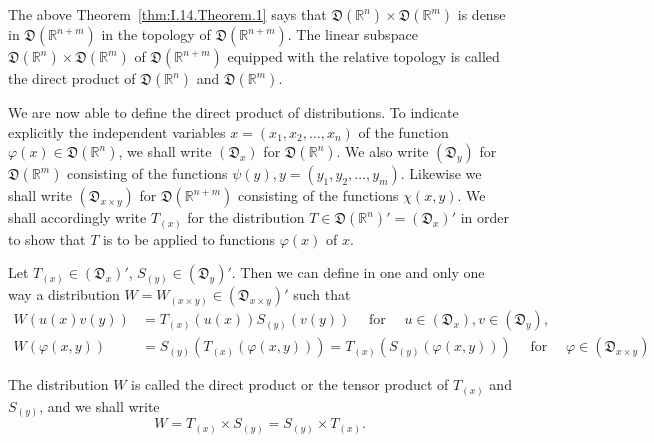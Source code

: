 The above Theorem~\ref{thm:I.14.Theorem.1} says that $\mathfrak{D}(\mathbb{R}^{n}) \times \mathfrak{D}(\mathbb{R}^{m})$ is dense in $\mathfrak{D}(\mathbb{R}^{n+m})$ in the topology of $\mathfrak{D}(\mathbb{R}^{n+m})$. The linear subspace $\mathfrak{D}(\mathbb{R}^{n}) \times \mathfrak{D}(\mathbb{R}^{m})$ of $\mathfrak{D}(\mathbb{R}^{n+m})$ equipped with the relative topology is called the direct product of $\mathfrak{D}(\mathbb{R}^{n})$ and $\mathfrak{D}(\mathbb{R}^{m})$. 

We are now able to define the direct product of distributions. To indicate explicitly the independent variables $x = (x_1, x_2, \ldots, x_n)$ of the function $\varphi(x) \in \mathfrak{D}(\mathbb{R}^{n})$, we shall write $(\mathfrak{D}_x)$ for $\mathfrak{D}(\mathbb{R}^{n})$. We also write $(\mathfrak{D}_y)$ for $\mathfrak{D}(\mathbb{R}^{m})$ consisting of the functions $\psi(y), y = (y_1, y_2, \ldots, y_m)$. Likewise we shall write $(\mathfrak{D}_{x \times y})$ for $\mathfrak{D}(\mathbb{R}^{n+m})$ consisting of the functions $\chi(x, y)$. We shall accordingly write $T_{(x)}$ for the distribution $T \in \mathfrak{D}(\mathbb{R}^{n})' = (\mathfrak{D}_x)'$ in order to show that $T$ is to be applied to functions $\varphi(x)$ of $x$. 

\begin{theorem}\label{thm:I.14.Theorem.2} Let $T_{(x)} \in (\mathfrak{D}_x)'$, $S_{(y)} \in (\mathfrak{D}_y)'$. Then we can define in one and only one way a distribution $W = W_{(x \times y)} \in (\mathfrak{D}_{x \times y})'$ such that 
\begin{align}
W (u (x) v (y))& = T_{(x)} (u (x)) S_{(y)} (v (y)) \quad \text{ for } \quad u \in (\mathfrak {D}_{x}), v \in (\mathfrak {D}_{y}), \label{eq:I.14.4} \\
W (\varphi (x, y))& = S_{(y)} \left(T_{(x)} (\varphi (x, y))\right) = T_{(x)} \left(S_{(y)} (\varphi (x, y))\right) \quad \text{ for } \quad \varphi \in (\mathfrak {D}_{x \times y}) \label{eq:I.14.5}
\end{align}
\end{theorem}

\begin{remarku} The distribution $W$ is called the direct product or the tensor product of $T_{(x)}$ and $S_{(y)}$, and we shall write 
\begin{equation}\label{eq:I.14.6}
W = T_{(x)} \times S_{(y)} = S_{(y)} \times T_{(x)}.
\end{equation}
\end{remarku}

